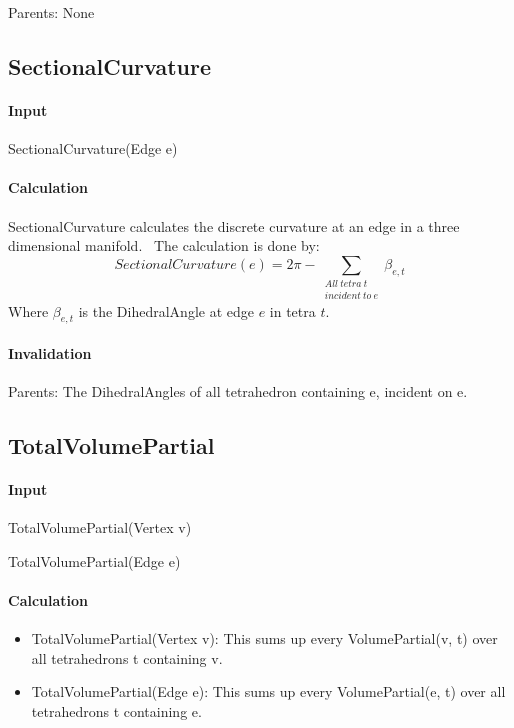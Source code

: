 Parents: None

\bigskip

\subsection{SectionalCurvature}

\paragraph{Input}

SectionalCurvature(Edge e)

\paragraph{Calculation}

SectionalCurvature calculates the discrete curvature at an edge in a three
dimensional manifold. \ The calculation is done by: 
\begin{equation*}
SectionalCurvature(e)=2\pi -\sum_{\substack{ All~tetra~t~ \\ incident~to~e}}%
\beta _{e,t}
\end{equation*}%
Where $\beta _{e,t}$ is the DihedralAngle at edge $e$ in tetra $t$.

\paragraph{Invalidation}

\bigskip Parents: The DihedralAngles of all tetrahedron containing e,
incident on e.

\subsection{TotalVolumePartial}

\paragraph{Input}

TotalVolumePartial(Vertex v)

TotalVolumePartial(Edge e)

\paragraph{Calculation}

\begin{itemize}
\item TotalVolumePartial(Vertex v): This sums up every VolumePartial(v, t)
over all tetrahedrons t containing v.

\item TotalVolumePartial(Edge e): This sums up every VolumePartial(e, t)
over all tetrahedrons t containing e.
\end{itemize}


